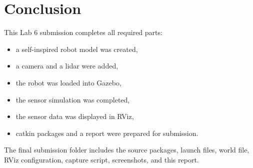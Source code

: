 \documentclass[11pt,a4paper]{article}
\begin{document}
\section{Conclusion}
This Lab 6 submission completes all required parts:

\begin{itemize}
  \item a self-inspired robot model was created,
  \item a camera and a lidar were added,
  \item the robot was loaded into Gazebo,
  \item the sensor simulation was completed,
  \item the sensor data was displayed in RViz,
  \item catkin packages and a report were prepared for submission.
\end{itemize}

The final submission folder includes the source packages, launch files, world file, RViz configuration, capture script, screenshots, and this report.
\end{document}
